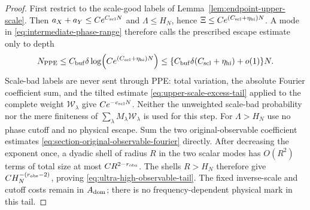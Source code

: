 \documentclass[11pt]{article}
\begin{document}
\begin{proof}
First restrict to the scale-good labels of
Lemma~\ref{lem:endpoint-upper-scale}.  Then
$a_X+a_Y\le Ce^{C_{\rm scl}N}$ and $\Lambda\le H_N$, hence
$\Xi\le Ce^{(C_{\rm scl}+\eta_{\rm hi})N}$.  A mode in
\eqref{eq:intermediate-phase-range} therefore calls the prescribed escape
estimate only to depth
\begin{equation}
\label{eq:intermediate-max-resolving-depth}
 N_{\rm PPE}\le C_{\rm buf}\delta
       \log\!\left(Ce^{(C_{\rm scl}+\eta_{\rm hi})N}\right)
 \le \{C_{\rm buf}\delta(C_{\rm scl}+\eta_{\rm hi})+o(1)\}N.
\end{equation}
Scale-bad labels are never sent through PPE: total variation, the absolute
Fourier coefficient sum, and the tilted estimate
\eqref{eq:upper-scale-excess-tail} applied to the complete weight
$\mathscr W_\lambda$ give $Ce^{-c_{\rm scl}N}$.  Neither the unweighted
scale-bad probability nor the mere finiteness of
$\sum_\lambda M_\lambda\mathscr W_\lambda$ is used for this step.
For $\Lambda>H_N$ use no phase cutoff and no physical escape.  Sum the two
original-observable coefficient estimates
\eqref{eq:section-original-observable-fourier} directly.  After decreasing
the exponent once, a dyadic shell of radius $R$ in the two scalar modes has
$O(R^2)$ terms of total size at most $CR^{2-r_{\rm obs}}$.  The shells
$R>H_N$ therefore give $CH_N^{-(r_{\rm obs}-2)}$, proving
\eqref{eq:ultra-high-observable-tail}.  The fixed inverse-scale and cutoff
costs remain in $A_{\rm dom}$; there is no frequency-dependent physical mark
in this tail.


\end{proof}
\end{document}
